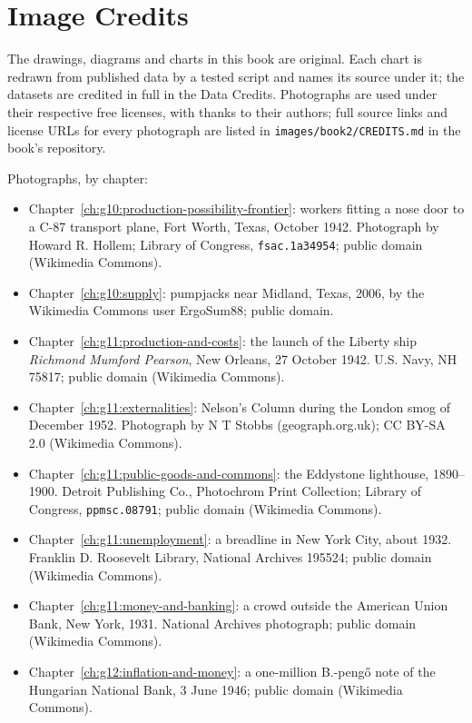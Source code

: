 \chapter*{Image Credits}

The drawings, diagrams and charts in this book are original. Each chart is
redrawn from published data by a tested script and names its source under it;
the datasets are credited in full in the Data Credits.
Photographs are used under their respective free licenses, with thanks to
their authors; full source links and license URLs for every photograph are
listed in \texttt{images/book2/CREDITS.md} in the book's repository.

\bigskip
\noindent Photographs, by chapter:
\begin{itemize}\small
  \item Chapter~\ref{ch:g10:production-possibility-frontier}: workers fitting a nose
    door to a C-87 transport plane, Fort Worth, Texas, October 1942. Photograph by
    Howard R. Hollem; Library of Congress, \texttt{fsac.1a34954}; public domain
    (Wikimedia Commons).
  \item Chapter~\ref{ch:g10:supply}: pumpjacks near Midland, Texas, 2006, by the
    Wikimedia Commons user ErgoSum88; public domain.
  \item Chapter~\ref{ch:g11:production-and-costs}: the launch of the Liberty ship
    \emph{Richmond Mumford Pearson}, New Orleans, 27 October 1942. U.S. Navy,
    NH 75817; public domain (Wikimedia Commons).
  \item Chapter~\ref{ch:g11:externalities}: Nelson's Column during the London smog
    of December 1952. Photograph by N T Stobbs (geograph.org.uk); CC BY-SA 2.0
    (Wikimedia Commons).
  \item Chapter~\ref{ch:g11:public-goods-and-commons}: the Eddystone lighthouse,
    1890--1900. Detroit Publishing Co., Photochrom Print Collection; Library of
    Congress, \texttt{ppmsc.08791}; public domain (Wikimedia Commons).
  \item Chapter~\ref{ch:g11:unemployment}: a breadline in New York City, about 1932.
    Franklin D. Roosevelt Library, National Archives 195524; public domain
    (Wikimedia Commons).
  \item Chapter~\ref{ch:g11:money-and-banking}: a crowd outside the American Union
    Bank, New York, 1931. National Archives photograph; public domain (Wikimedia
    Commons).
  \item Chapter~\ref{ch:g12:inflation-and-money}: a one-million B.-pengő note of the
    Hungarian National Bank, 3 June 1946; public domain (Wikimedia Commons).
\end{itemize}
